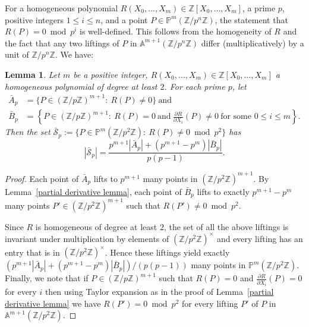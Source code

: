 \documentclass[12pt]{amsart}
\newtheorem{lemma}[theorem]{Lemma}
\newcommand{\Z}{\mathbb{Z}}
\numberwithin{equation}{section}
\begin{document}
For a homogeneous polynomial $R(X_0,\ldots,X_m)\in \Z[X_0,\ldots,X_m]$, a prime $p$, positive integers $1\leq i\leq n$, and a point $P\in\mathbb{P}^{m}(\Z/p^n\Z)$, the statement that 
$R(P)=0\bmod p^i$ is well-defined. This follows from the homogeneity of $R$ and the fact that any two liftings of $P$ in $\mathbb{A}^{m+1}(\Z/p^n\Z)$ differ (multiplicatively) by a unit of $\Z/p^n\Z$. We have:

\begin{lemma}\label{lem:A_p B_p S_p}
    Let $m$ be a positive integer, $R(X_0,\ldots,X_m)\in\Z[X_0,\ldots,X_m]$ a homogeneous polynomial of degree at least $2$. For each prime $p$, let
    \begin{align*}
        \bar{A}_p&=\{P\in(\Z/p\Z)^{m+1}:\ R(P)\neq 0\}\ \text{and}\\
        \bar{B}_p&=\left\{P\in(\Z/p\Z)^{m+1}:\ R(P)=0\ \text{and}\  \frac{\partial R}{\partial X_i}(P)\neq 0\ \text{for some $0\leq i\leq m$}\right\}.
    \end{align*}
    Then the set $\bar{\mathcal{S}}_p:=\{P\in\mathbb{P}^{m}(\Z/p^2\Z):\ R(P)\neq 0\bmod p^2\}$
    has
    $$|\bar{\mathcal{S}}_p|=\frac{p^{m+1}|\bar{A}_p|+(p^{m+1}-p^m)|\bar{B}_p|}{p(p-1)}.$$
\end{lemma}
\begin{proof}
    Each point of $\bar{A}_p$ lifts to $p^{m+1}$ many points in $(\Z/p^2\Z)^{m+1}$. 
    By Lemma~\ref{partial derivative lemma}, each point of $\bar{B}_p$ lifts to exactly $p^{m+1}-p^m$ many 
    points $P'\in (\Z/p^2\Z)^{m+1}$ such that $R(P')\neq 0\bmod p^2$. 
    
    Since $R$ is homogeneous of degree at least $2$, the set of all the above liftings is invariant under multiplication by elements of $(\Z/p^2\Z)^\times$ and every lifting has an entry that is in $(\Z/p^2\Z)^\times$. Hence these liftings yield exactly $(p^{m+1}|\bar{A}_p|+(p^{m+1}-p^m)|\bar{B}_p|)/(p(p-1))$ many points in $\mathbb{P}^m(\Z/p^2\Z)$. Finally, we note that if $P\in(\Z/p\Z)^{m+1}$ such that $R(P)=0$ and $\displaystyle\frac{\partial R}{\partial X_i}(P)=0$ for every $i$ then using Taylor expansion
    as in the proof of Lemma~\ref{partial derivative lemma} we have $R(P')=0\bmod p^2$
    for every lifting $P'$ of $P$ in $\mathbb{A}^{m+1}(\Z/p^2\Z)$.   
\end{proof}
\end{document}
